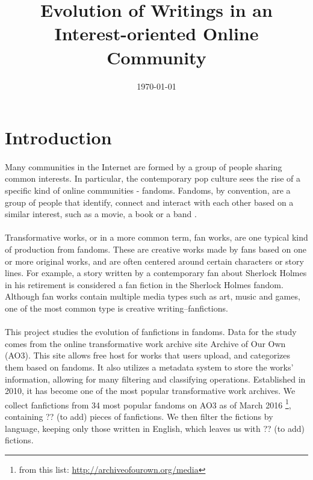 \documentclass[11pt]{article} %
\begin{document}

\title{Evolution of Writings in an Interest-oriented Online Community} %
\date{\today}
\maketitle %

\section{Introduction} %
\label{sec:introduction}
\paragraph{} Many communities in the Internet are formed by a group of people sharing common interests. In particular, the contemporary pop culture sees the rise of a specific kind of online communities - fandoms. Fandoms, by convention, are a group of people that identify, connect and interact with each other based on a similar interest, such as a movie, a book or a band \cite{wiki:fandom}. 

\paragraph{}Transformative works, or in a more common term, fan works, are one typical kind of production from fandoms\cite{wiki:transf_work}. These are creative works made by fans based on one or more original works, and are often centered around certain characters or story lines. For example, a story written by a contemporary fan about Sherlock Holmes in his retirement is considered a fan fiction in the Sherlock Holmes fandom. Although fan works contain multiple media types such as art, music and games, one of the most common type is creative writing--fanfictions.

\paragraph{} This project studies the evolution of fanfictions in fandoms. Data for the study comes from the online transformative work archive site Archive of Our Own (AO3). This site allows free host for works that users upload, and categorizes them based on fandoms. It also utilizes a metadata system to store the works' information, allowing for many filtering and classifying operations. Established in 2010, it has become one of the most popular transformative work archives. We collect fanfictions from 34 most popular fandoms on AO3 as of March 2016 \footnote{from this list: \url{http://archiveofourown.org/media}}, containing ?? (to add) pieces of fanfictions. We then filter the fictions by language, keeping only those written in English, which leaves us with ?? (to add) fictions.
\end{document}

